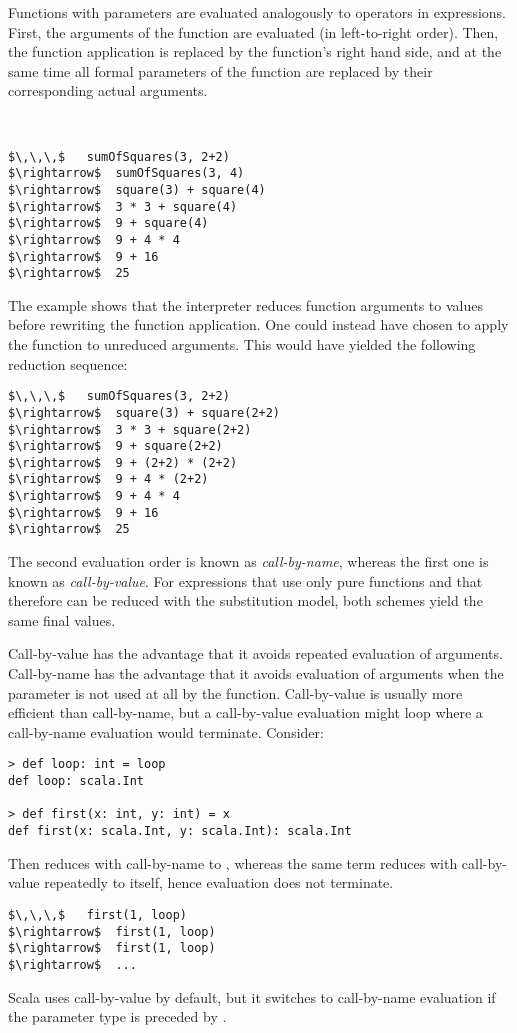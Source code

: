 Functions with parameters are evaluated analogously to operators in
expressions. First, the arguments of the function are evaluated (in
left-to-right order). Then, the function application is replaced by
the function's right hand side, and at the same time all formal
parameters of the function are replaced by their corresponding actual
arguments.

\example\ 
 
\begin{lstlisting}
$\,\,\,$   sumOfSquares(3, 2+2)
$\rightarrow$  sumOfSquares(3, 4)
$\rightarrow$  square(3) + square(4)
$\rightarrow$  3 * 3 + square(4)
$\rightarrow$  9 + square(4)
$\rightarrow$  9 + 4 * 4
$\rightarrow$  9 + 16
$\rightarrow$  25
\end{lstlisting}

The example shows that the interpreter reduces function arguments to
values before rewriting the function application.  One could instead
have chosen to apply the function to unreduced arguments. This would
have yielded the following reduction sequence:
\begin{lstlisting}
$\,\,\,$   sumOfSquares(3, 2+2)
$\rightarrow$  square(3) + square(2+2)
$\rightarrow$  3 * 3 + square(2+2)
$\rightarrow$  9 + square(2+2)
$\rightarrow$  9 + (2+2) * (2+2)
$\rightarrow$  9 + 4 * (2+2)
$\rightarrow$  9 + 4 * 4
$\rightarrow$  9 + 16
$\rightarrow$  25
\end{lstlisting}

The second evaluation order is known as \emph{call-by-name},
whereas the first one is known as \emph{call-by-value}.  For
expressions that use only pure functions and that therefore can be
reduced with the substitution model, both schemes yield the same final
values.  

Call-by-value has the advantage that it avoids repeated evaluation of
arguments. Call-by-name has the advantage that it avoids evaluation of
arguments when the parameter is not used at all by the function.
Call-by-value is usually more efficient than call-by-name, but a
call-by-value evaluation might loop where a call-by-name evaluation
would terminate. Consider:
\begin{lstlisting}
> def loop: int = loop
def loop: scala.Int

> def first(x: int, y: int) = x
def first(x: scala.Int, y: scala.Int): scala.Int
\end{lstlisting}
Then  reduces with call-by-name to ,
whereas the same term reduces with call-by-value repeatedly to itself,
hence evaluation does not terminate.
\begin{lstlisting}
$\,\,\,$   first(1, loop)
$\rightarrow$  first(1, loop)
$\rightarrow$  first(1, loop)
$\rightarrow$  ...
\end{lstlisting}
Scala uses call-by-value by default, but it switches to call-by-name evaluation
if the parameter type is preceded by \code{=>}.

